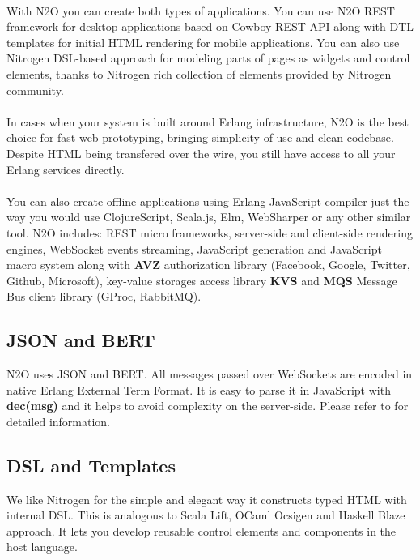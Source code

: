 \paragraph{}
With N2O you can create both types of applications. You can use N2O REST framework
for desktop applications based on Cowboy REST API along with DTL
templates for initial HTML rendering for mobile applications.
You can also use Nitrogen DSL-based approach for modeling parts of pages
as widgets and control elements, thanks to Nitrogen
rich collection of elements provided by Nitrogen community.

\paragraph{}
In cases when your system is built around Erlang infrastructure, N2O
is the best choice for fast web prototyping, bringing simplicity
of use and clean codebase. Despite HTML being transfered over the wire,
you still have access to all your Erlang services directly.

\paragraph{}
You can also create offline applications using Erlang JavaScript compiler
just the way you would use ClojureScript, Scala.js, Elm, WebSharper
or any other similar tool. N2O includes: REST micro frameworks,
server-side and client-side rendering engines,
WebSocket events streaming, JavaScript generation
and JavaScript macro system along with {\bf AVZ} authorization
library (Facebook, Google, Twitter, Github, Microsoft), key-value storages
access library {\bf KVS} and {\bf MQS} Message Bus client library (GProc, RabbitMQ).

\subsection{JSON and BERT}
N2O uses JSON and BERT. All messages passed over
WebSockets are encoded in native Erlang External Term Format.
It is easy to parse it in JavaScript with {\bf dec(msg)}
and it helps to avoid complexity on the server-side. Please refer
to  for detailed information.

\subsection{DSL and Templates}
We like Nitrogen for the simple and elegant way it constructs typed
HTML with internal DSL. This is analogous to Scala Lift,
OCaml Ocsigen and Haskell Blaze approach. It lets you develop reusable control
elements and components in the host language.

